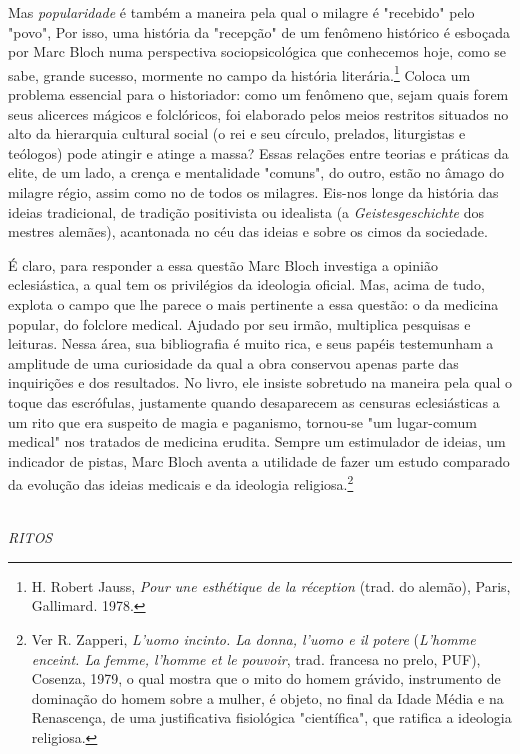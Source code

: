 \documentclass[a5paper]{book}
\begin{document}
Mas \textit{popularidade} é também a maneira pela qual o milagre é "recebido" pelo "povo", Por isso, uma história da "recepção" de um fenômeno histórico é esboçada por Marc Bloch numa perspectiva sociopsicológica que conhecemos hoje, como se sabe, grande sucesso, mormente no campo da história literária.\footnote{H. Robert Jauss, \textit{Pour une esthétique de la réception} (trad. do alemão), Paris, Gallimard. 1978.} Coloca um problema essencial para o historiador: como um fenômeno que, sejam quais forem seus alicerces mágicos e folclóricos, foi elaborado pelos meios restritos situados no alto da hierarquia cultural social (o rei e seu círculo, prelados, liturgistas e teólogos) pode atingir e atinge a massa? Essas relações entre teorias e práticas da elite, de um lado, a crença e mentalidade "comuns", do outro, estão no âmago do milagre régio, assim como no de todos os milagres. Eis-nos longe da história das ideias tradicional, de tradição positivista ou idealista (a \textit{Geistesgeschichte} dos mestres alemães), acantonada no céu das ideias e sobre os cimos da sociedade.

É claro, para responder a essa questão Marc Bloch investiga a opinião eclesiástica, a qual tem os privilégios da ideologia of{\kern0pt}icial. Mas, acima de tudo, explota o campo que lhe parece o mais pertinente a essa questão: o da medicina popular, do folclore medical. Ajudado por seu irmão, multiplica pesquisas e leituras. Nessa área, sua bibliograf{\kern0pt}ia é muito rica, e seus papéis testemunham a amplitude de uma curiosidade da qual a obra conservou apenas parte das inquirições e dos resultados. No livro, ele insiste sobretudo na maneira pela qual o toque das escrófulas, justamente quando desaparecem as censuras eclesiásticas a um rito que era suspeito de magia e paganismo, tornou-se "um lugar-comum medical" nos tratados de medicina erudita. Sempre um estimulador de ideias, um indicador de pistas, Marc Bloch aventa a utilidade de fazer um estudo comparado da evolução das ideias medicais e da ideologia religiosa.\footnote{Ver R. Zapperi, \textit{L'uomo incinto. La donna, l'uomo e il potere} (\textit{L'homme enceint. La femme, l'homme et le pouvoir}, trad. francesa no prelo, PUF), Cosenza, 1979, o qual mostra que o mito do homem grávido, instrumento de dominação do homem sobre a mulher, é objeto, no f{\kern0pt}inal da Idade Média e na Renascença, de uma justif{\kern0pt}icativa f{\kern0pt}isiológica "científ{\kern0pt}ica", que ratif{\kern0pt}ica a ideologia religiosa.}

~\\ \large \textit{RITOS} ~\\
\end{document}
